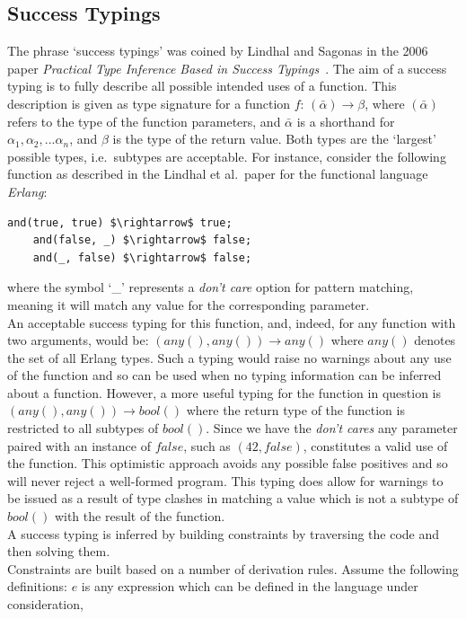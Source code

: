 \documentclass[12pt, titlepage]{article}
\begin{document}
\subsection{Success Typings}
The phrase `success typings' was coined by Lindhal and Sagonas in the 2006 paper \textit{Practical Type Inference Based in Success Typings}~\cite{lindhal06}. The aim of a success typing is to fully describe all possible intended uses of a function. This description is given as type signature for a function $f$: $(\bar{\alpha}) \rightarrow \beta$, where $(\bar{\alpha})$ refers to the type of the function parameters, and $\bar{\alpha}$ is a shorthand for $\alpha_1, \alpha_2,...\alpha_n$, and $\beta$ is the type of the return value. Both types are the `largest' possible types, i.e.\ subtypes are acceptable. For instance, consider the following function as described in the Lindhal et al.\ paper for the functional language \textit{Erlang}:
\begin{lstlisting}[mathescape]
	and(true, true) $\rightarrow$ true;
	and(false, _) $\rightarrow$ false;
	and(_, false) $\rightarrow$ false;
\end{lstlisting}
where the symbol `\_' represents a \textit{don't care} option for pattern matching, meaning it will match any value for the corresponding parameter. \\
An acceptable success typing for this function, and, indeed, for any function with two arguments, would be: $(any(), any()) \rightarrow any()$ where $any()$ denotes the set of all Erlang types. Such a typing would raise no warnings about any use of the function and so can be used when no typing information can be inferred about a function. However, a more useful typing for the function in question is $(any(), any()) \rightarrow bool()$ where the return type of the function is restricted to all subtypes of $bool()$. Since we have the \textit{don't cares} any parameter paired with an instance of $false$, such as $(42, false)$, constitutes a valid use of the function. This optimistic approach avoids any possible false positives and so will never reject a well-formed program. This typing does allow for warnings to be issued as a result of type clashes in matching a value which is not a subtype of $bool()$ with the result of the function. \\
A success typing is inferred by building constraints by traversing the code and then solving them. \\
Constraints are built based on a number of derivation rules. Assume the following definitions:
$e$ is any expression which can be defined in the language under consideration, \\
\end{document}
